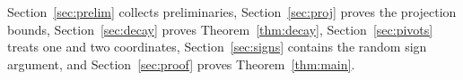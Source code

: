 Section~\ref{sec:prelim} collects preliminaries, Section~\ref{sec:proj} proves the projection bounds, Section~\ref{sec:decay} proves Theorem~\ref{thm:decay}, Section~\ref{sec:pivots} treats one and two coordinates, Section~\ref{sec:signs} contains the random sign argument, and Section~\ref{sec:proof} proves Theorem~\ref{thm:main}.

